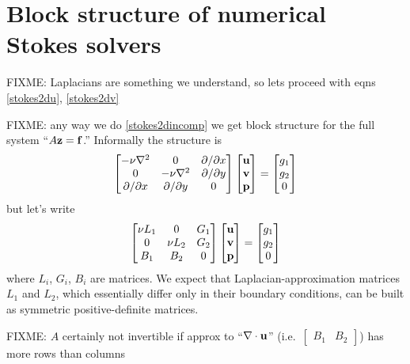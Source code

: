 \section{Block structure of numerical Stokes solvers}

FIXME: Laplacians are something we understand, so lets proceed with eqns \eqref{stokes2du}, \eqref{stokes2dv}

FIXME: any way we do \eqref{stokes2dincomp} we get block structure for the full system ``$A \mathbf{z} = \mathbf{f}$.''  Informally the structure is
  $$\begin{bmatrix}
    -\nu\nabla^2 & 0 & \partial/\partial x \\
    0 & -\nu\nabla^2 & \partial/\partial y \\
    \partial/\partial x & \partial/\partial y & 0
    \end{bmatrix}
    \begin{bmatrix}
    \mathbf{u} \\ \mathbf{v} \\ \mathbf{p}
    \end{bmatrix}
    =
    \begin{bmatrix}
    g_1 \\ g_2 \\ 0
    \end{bmatrix}
    $$
but let's write
  $$\begin{bmatrix}
    \nu L_1 & 0 & G_1 \\
    0 & \nu L_2 & G_2 \\
    B_1 & B_2 & 0
    \end{bmatrix}
    \begin{bmatrix}
    \mathbf{u} \\ \mathbf{v} \\ \mathbf{p}
    \end{bmatrix}
    =
    \begin{bmatrix}
    g_1 \\ g_2 \\ 0
    \end{bmatrix}
    $$
where $L_i$, $G_i$, $B_i$ are matrices.  We expect that Laplacian-approximation matrices $L_1$ and $L_2$, which essentially differ only in their boundary conditions, can be built as symmetric positive-definite matrices.

FIXME: $A$ certainly not invertible if approx to ``$\nabla\cdot \mathbf{u}$'' (i.e.~$\begin{bmatrix} B_1 & B_2 \end{bmatrix}$) has more rows than columns

